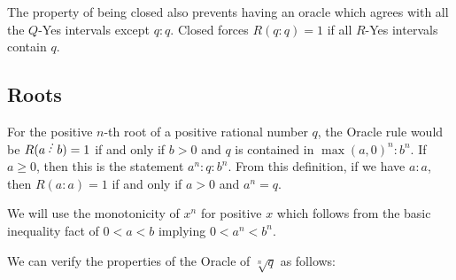 \documentclass[12pt]{article}
\begin{document}
The property of being closed also prevents having an oracle which agrees with all the $Q$-Yes intervals except $q:q$. Closed forces $R(q:q)=1$ if all $R$-Yes intervals contain $q$.

\subsection{Roots}\label{sec:roots}

For the positive $n$-th root of a positive rational number $q$, the Oracle rule would be $R(a\lte b) = 1$ if and only if $b> 0$ and $q$ is contained in $\max(a,0)^n:b^n$. If $a\geq 0$, then this is the statement $a^n:q:b^n$. From this definition, if we have $a:a$, then $R(a:a) = 1$ if and only if $a>0$ and $a^n = q$.

We will use the monotonicity of $x^n$ for positive $x$ which follows from the basic inequality fact of $ 0 < a < b$ implying $0 < a^n < b^n$.

We can verify the properties of the Oracle of $\sqrt[n]{q}$ as follows: 
\end{document}
